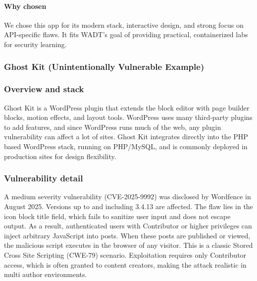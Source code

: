 \documentclass[12pt,titlepage]{article}
\begin{document}
\paragraph{Why chosen}
We chose this app for its modern stack, interactive design, and strong focus on API-specific flaws. It fits WADT’s goal of providing practical, containerized labs for security learning.

\subsubsection{Ghost Kit (Unintentionally Vulnerable Example)}
\subsubsection*{Overview and stack}
Ghost Kit is a WordPress plugin that extends the block editor with page builder blocks, motion effects, and layout tools. WordPress uses many third‑party plugins to add features, and since WordPress runs much of the web, any plugin vulnerability can affect a lot of sites. Ghost Kit integrates directly into the PHP based WordPress stack, running on PHP/MySQL, and is commonly deployed in production sites for design flexibility.

\subsubsection*{Vulnerability detail}
A medium severity vulnerability (CVE-2025-9992) was disclosed by Wordfence in August 2025. Versions up to and including 3.4.13 are affected. The flaw lies in the icon block title field, which fails to sanitize user input and does not escape output. As a result, authenticated users with Contributor or higher privileges can inject arbitrary JavaScript into posts. When these posts are published or viewed, the malicious script executes in the browser of any visitor. This is a classic Stored Cross Site Scripting (CWE-79) scenario. Exploitation requires only Contributor access, which is often granted to content creators, making the attack realistic in multi author environments.
\end{document}

